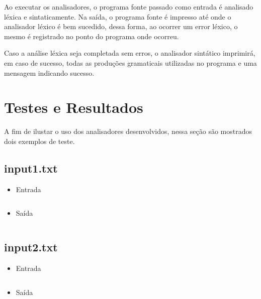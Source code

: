 \documentclass[a4paper,12pt]{report}
\begin{document}
Ao executar os analisadores, o programa fonte passado como entrada é analisado
léxica e sintaticamente. Na saída, o programa fonte é impresso até onde o analisador
léxico é bem sucedido, dessa forma, ao ocorrer um error léxico, o mesmo é registrado
no ponto do programa onde ocorreu.

Caso a análise léxica seja completada sem erros, o analisador sintático imprimirá,
em caso de sucesso, todas as produções gramaticais utilizadas no programa e uma mensagem
indicando sucesso.

\section{Testes e Resultados}

A fim de ilustar o uso dos analisadores desenvolvidos, nessa seção são mostrados
dois exemplos de teste.

\subsection{input1.txt}

\begin{itemize}
 \item Entrada
 
 \begin{mdframed}[linecolor=black, leftline=false, rightline=false, backgroundcolor=gray!20!white]
    \inputminted[linenos, fontsize=\footnotesize]{text}{../src/input/input1.txt}
\end{mdframed}
 
 \item Saída

\begin{mdframed}[linecolor=black, leftline=false, rightline=false, backgroundcolor=gray!20!white]
    \inputminted[linenos, fontsize=\footnotesize]{text}{../src/output1.txt}
\end{mdframed}
 
\end{itemize}

\subsection{input2.txt}

\begin{itemize}
 \item Entrada
 
 \begin{mdframed}[linecolor=black, leftline=false, rightline=false, backgroundcolor=gray!20!white]
    \inputminted[linenos, fontsize=\footnotesize]{text}{../src/input/input2.txt}
\end{mdframed}
 
 \item Saída

\begin{mdframed}[linecolor=black, leftline=false, rightline=false, backgroundcolor=gray!20!white]
    \inputminted[linenos, fontsize=\footnotesize]{text}{../src/output2.txt}
\end{mdframed}
 
\end{itemize}
\end{document}
